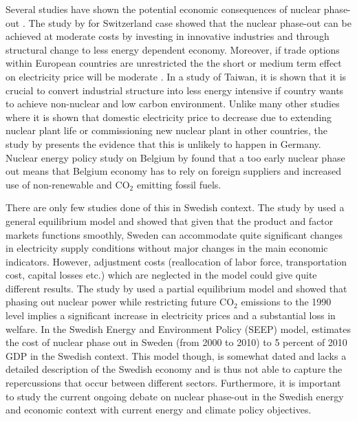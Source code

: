 Several studies have shown the potential economic consequences of nuclear phase-out \citep{Bohringer2002, Nestle2012, Bretschger2012, Duscha0, Glomsrod2013, Kunsch2014}. The study by \cite{Bretschger2012} for Switzerland case showed that the nuclear phase-out can be achieved at moderate costs by investing in innovative industries and through structural change to less energy dependent economy. Moreover, if trade options within European countries are unrestricted the the short or medium term effect on electricity price will be moderate \citep{Glomsrod2013}. In a study \citep{Chen2013} of Taiwan, it is shown that it is crucial to convert industrial structure into less energy intensive if country wants to achieve non-nuclear and low carbon environment. Unlike many other studies where it is shown that domestic electricity price to decrease due to extending nuclear plant life or commissioning new nuclear plant in other countries, the study by \citep{Nestle2012} presents the evidence that this is unlikely to happen in Germany. Nuclear energy policy study on Belgium by \cite{Kunsch2014} found that a too early nuclear phase out means that Belgium economy has to rely on foreign suppliers and increased use of non-renewable and CO$_2$ emitting fossil fuels.

There are only few studies done of this in Swedish context. The study by \cite{Bergman1981} used a general equilibrium model and showed that given that the product and factor markets functions smoothly, Sweden can accommodate quite significant changes in electricity supply conditions without major changes in the main economic indicators. However, adjustment costs (reallocation of labor force, transportation cost, capital losses etc.) which are neglected in the model could give quite different results. The study by \cite{Andersson1997} used a partial equilibrium model and showed that phasing out nuclear power while restricting future CO$_2$ emissions to the 1990 level implies a significant increase in electricity prices and a substantial loss in welfare. In the Swedish Energy and Environment Policy (SEEP) model, \cite{nordhaus1997swedish} estimates the cost of nuclear phase out in Sweden (from 2000 to 2010) to 5 percent of 2010 GDP in the Swedish context. This model though, is somewhat dated and lacks a detailed description of the Swedish economy and is thus not able to capture the repercussions that occur between different sectors. Furthermore, it is important to study the current ongoing debate on nuclear phase-out in the Swedish energy and economic context with current energy and climate policy objectives.


